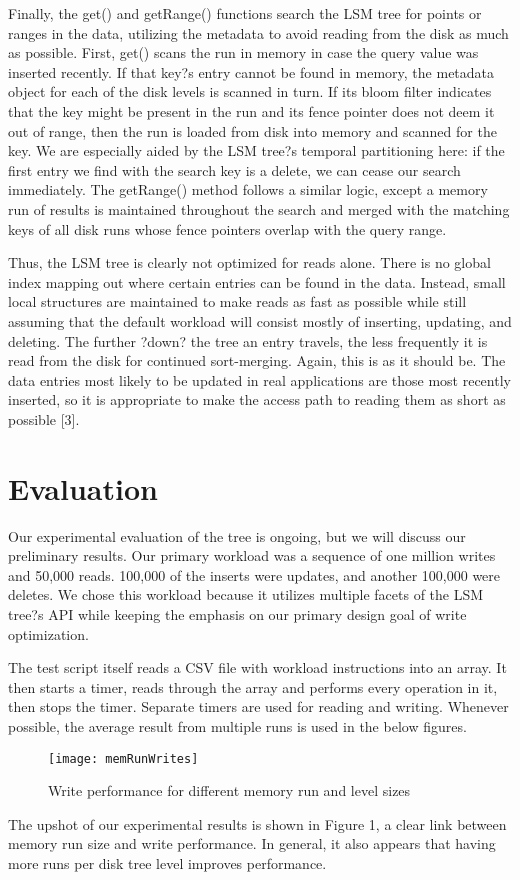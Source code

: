 \documentclass[12pt]{article}
\begin{document}
	Finally, the get() and getRange() functions search the LSM tree for points or ranges in the data, utilizing the metadata to avoid reading from the disk as much as possible. First, get() scans the run in memory in case the query value was inserted recently. If that key?s entry cannot be found in memory, the metadata object for each of the disk levels is scanned in turn. If its bloom filter indicates that the key might be present in the run and its fence pointer does not deem it out of range, then the run is loaded from disk into memory and scanned for the key. We are especially aided by the LSM tree?s temporal partitioning here: if the first entry we find with the search key is a delete, we can cease our search immediately. The getRange() method follows a similar logic, except a memory run of results is maintained throughout the search and merged with the matching keys of all disk runs whose fence pointers overlap with the query range.
	
	Thus, the LSM tree is clearly not optimized for reads alone. There is no global index mapping out where certain entries can be found in the data. Instead, small local structures are maintained to make reads as fast as possible while still assuming that the default workload will consist mostly of inserting, updating, and deleting. The further ?down? the tree an entry travels, the less frequently it is read from the disk for continued sort-merging. Again, this is as it should be. The data entries most likely to be updated in real applications are those most recently inserted, so it is appropriate to make the access path to reading them as short as possible [3].

\section{Evaluation}
\indent \indent Our experimental evaluation of the tree is ongoing, but we will discuss our preliminary results. Our primary workload was a sequence of one million writes and 50,000 reads. 100,000 of the inserts were updates, and another 100,000 were deletes. We chose this workload because it utilizes multiple facets of the LSM tree?s API while keeping the emphasis on our primary design goal of write optimization.

The test script itself reads a CSV file with workload instructions into an array. It then starts a timer, reads through the array and performs every operation in it, then stops the timer. Separate timers are used for reading and writing. Whenever possible, the average result from multiple runs is used in the below figures.
  \begin{figure}[h!]
 \centering
  \texttt{[image: memRunWrites]}
 \caption{Write performance for different memory run and level sizes}
 \end{figure}
The upshot of our experimental results is shown in Figure 1, a clear link between memory run size and write performance. In general, it also appears that having more runs per disk tree level improves performance. 
\end{document}
